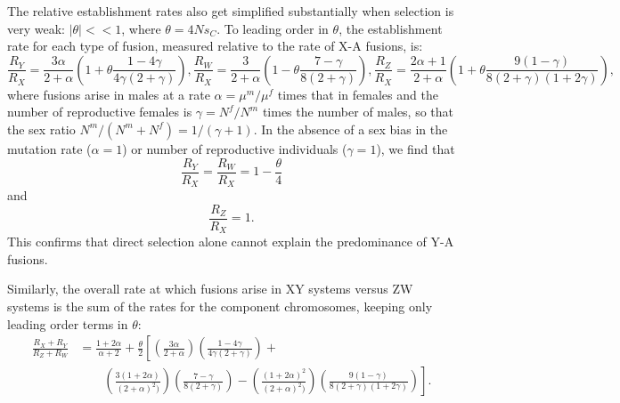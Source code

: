 The relative establishment rates also get simplified substantially when selection is very weak: $|\theta| << \text{1}$, where $\theta=\text{4}Ns_C$. To leading order in $\theta$, the establishment rate for each type of fusion, measured relative to the rate of X-A fusions, is:
\begin{subequations}
\begin{equation}
\frac{R_Y}{R_X} = \frac{\text{3}\alpha}{\text{2} +\alpha} \left(\text{1} + \theta \frac{\text{1} - \text{4}\gamma}{\text{4}\gamma(\text{2}+\gamma)} \right),
\end{equation}
\begin{equation}
\frac{R_W}{R_X} = \frac{\text{3}}{\text{2} +\alpha} \left(\text{1} - \theta \frac{\text{7} - \gamma}{\text{8}(\text{2}+\gamma)} \right),
\end{equation}
\begin{equation}
\frac{R_Z}{R_X} = \frac{\text{2}\alpha + \text{1}}{\text{2} +\alpha} \left(\text{1} + \theta \frac{\text{9}(\text{1} - \gamma)}{\text{8}(\text{2}+\gamma)(\text{1}+\text{2}\gamma)} \right),
\end{equation}
\end{subequations}
where fusions arise in males at a rate $\alpha=\mu^m/\mu^f$ times that in females and the number of reproductive females is $\gamma=N^f/N^m$ times the number of males, so that the sex ratio $N^m/(N^m + N^f) = \text{1}/(\gamma + 1)$. In the absence of a sex bias in the mutation rate ($\alpha=\text{1}$) or number of reproductive individuals ($\gamma=\text{1}$), we find that 
\[\frac{R_Y}{R_X}=\frac{R_W}{R_X}=\text{1} - \frac{\theta}{\text{4}} \]
and 
\[\frac{R_Z}{R_X} = \text{1}.\]
This confirms that direct selection alone cannot explain the predominance of Y-A fusions. 

Similarly, the overall rate at which fusions arise in XY systems versus ZW systems is the sum of the rates for the component chromosomes, keeping only leading order terms in $\theta$:
\begin{align}
\frac{R_X + R_Y}{R_Z + R_W} &= \frac{\text{1}+\text{2}\alpha}{\alpha + \text{2}} 
+ \frac{\theta}{\text{2}} \left[ \left(\frac{\text{3}\alpha}{\text{2} + \alpha} \right)
\left(\frac{\text{1}-\text{4}\gamma}{\text{4}\gamma(\text{2}+\gamma)}\right) +  \right. \nonumber \\
&\qquad \left.
\left(\frac{\text{3}(\text{1}+\text{2}\alpha)}{(\text{2}+\alpha)^\text{2})} \right)
\left(\frac{\text{7}-\gamma}{\text{8}(\text{2}+\gamma)} \right) - 
\left(\frac{(\text{1}+\text{2}\alpha)^\text{2}}{(\text{2}+\alpha)^\text{2})} \right)
\left(\frac{\text{9}(\text{1}-\gamma)}{\text{8}(\text{2}+\gamma)(\text{1}+\text{2}\gamma)} \right) \right].
\end{align}

